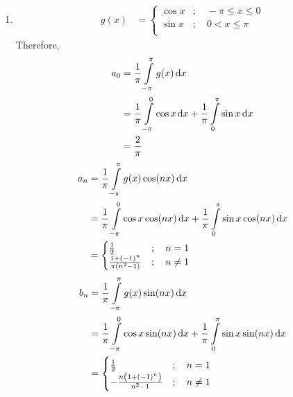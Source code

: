 \documentclass[fleqn, a4paper, 11pt, oneside]{amsart}
\theoremstyle{definition}
\theoremstyle{theorem}
\begin{document}
\begin{solution}
	\begin{enumerate}[leftmargin=*]
		\item
			\begin{align*}
				g(x) &=
					\begin{cases}
						\cos x & ;\quad -\pi \le x \le 0 \\
						\sin x & ;\quad 0 < x \le \pi    \\
					\end{cases}
			\end{align*}
			Therefore,
			\begin{align*}
				a_0 & = \frac{1}{\pi} \int\limits_{-\pi}^{\pi} g(x) \dif x                                                     \\
                                    & = \frac{1}{\pi} \int\limits_{-\pi}^{0} \cos x \dif x + \frac{1}{\pi} \int\limits_{0}^{\pi} \sin x \dif x \\
                                    & = \frac{2}{\pi}
			\end{align*}
			\begin{align*}
				a_n &= \frac{1}{\pi} \int\limits_{-\pi}^{\pi} g(x) \cos(n x) \dif x\\
				&= \frac{1}{\pi} \int\limits_{-\pi}^{0} \cos x \cos(n x) \dif x + \frac{1}{\pi} \int\limits_{0}^{\pi} \sin x \cos(n x) \dif x\\
				&=
					\begin{cases}
						\frac{1}{2}                                   & ;\quad n = 1    \\
						\frac{1 + (-1)^n}{\pi \left( n^2 - 1 \right)} & ;\quad n \neq 1 \\
					\end{cases}
			\end{align*}
			\begin{align*}
				b_n &= \frac{1}{\pi} \int\limits_{-\pi}^{\pi} g(x) \sin(n x) \dif x\\
				&= \frac{1}{\pi} \int\limits_{-\pi}^{0} \cos x \sin(n x) \dif x + \frac{1}{\pi} \int\limits_{0}^{\pi} \sin x \sin(n x) \dif x\\
				&=
					\begin{cases}
						\frac{1}{2}                                  & ;\quad n = 1    \\
						-\frac{n \left( 1 + (-1)^n \right)}{n^2 - 1} & ;\quad n \neq 1 \\
					\end{cases}
			\end{align*}

\end{enumerate}
\end{solution}
\end{document}
